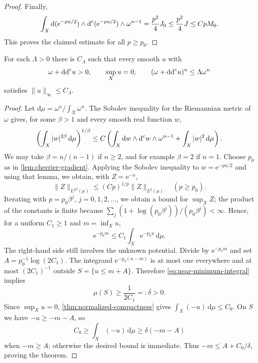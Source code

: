 \begin{proof}
Finally,
\[
 \int_X\mathrm{d}(\mathrm{e}^{-pu/2})\wedge\mathrm d^{\mathrm c}(\mathrm{e}^{-pu/2})\wedge\omega^{n-1}
 =\frac{p^2}{4}J_0\leq\frac{p^2}{4}J\leq CpM_0.
\]
This proves the claimed estimate for all $p\geq p_0$.
\end{proof}

\begin{theorem}\label{thm:smooth-czero}
For each $\Lambda>0$ there is $C_\Lambda$ such that every smooth $u$ with
\[
 \omega+\mathrm{dd}^{\mathrm{c}} u>0,\qquad \sup_Xu=0,\qquad
 (\omega+\mathrm{dd}^{\mathrm{c}} u)^n\leq\Lambda\omega^n
\]
satisfies $\|u\|_\infty\leq C_\Lambda$.
\end{theorem}
\begin{proof}
Let $\mathrm{d}\mu=\omega^n/\int_X\omega^n$. The Sobolev inequality for the Riemannian metric of $\omega$ gives, for some $\beta>1$ and every smooth real function $w$,
\[
 \left(\int_X |w|^{2\beta}\,\mathrm{d}\mu\right)^{1/\beta}
 \leq C\left(\int_X\mathrm{d}w\wedge\mathrm d^{\mathrm c} w\wedge\omega^{n-1}
                         +\int_X|w|^2\,\mathrm{d}\mu\right).
\]
We may take $\beta=n/(n-1)$ if $n\geq2$, and for example $\beta=2$ if $n=1$. Choose $p_0$ as in \cref{lem:cherrier-gradient}. Applying the Sobolev inequality to $w=\mathrm{e}^{-pu/2}$ and using that lemma, we obtain, with $Z=\mathrm{e}^{-u}$,
\[
 \|Z\|_{L^{p\beta}(\mu)}\leq(Cp)^{1/p}\|Z\|_{L^p(\mu)}
 \quad(p\geq p_0).
\]
Iterating with $p=p_0\beta^j$, $j=0,1,2,\ldots$, we obtain a bound for $\sup_XZ$; the product of the constants is finite because
$\sum_j(1+\log(p_0\beta^j))/(p_0\beta^j)<\infty$. Hence, for a uniform $C_1\geq1$ and $m=\inf_Xu$,
\begin{equation}\label{eq:near-minimum-integral}
 \mathrm{e}^{-p_0m}\leq C_1\int_X\mathrm{e}^{-p_0u}\,\mathrm{d}\mu.
\end{equation}
The right-hand side still involves the unknown potential. Divide by $\mathrm{e}^{-p_0m}$ and set $A=p_0^{-1}\log(2C_1)$. The integrand $\mathrm{e}^{-p_0(u-m)}$ is at most one everywhere and at most $(2C_1)^{-1}$ outside $S=\{u\leq m+A\}$. Therefore \eqref{eq:near-minimum-integral} implies
\[
 \mu(S)\geq\frac1{2C_1}=:\delta>0.
\]
Since $\sup_Xu=0$, \cref{thm:normalized-compactness} gives $\int_X(-u)\,\mathrm{d}\mu\leq C_0$. On $S$ we have $-u\geq-m-A$, so
\[
 C_0\geq\int_X(-u)\,\mathrm{d}\mu\geq\delta(-m-A)
\]
when $-m\geq A$; otherwise the desired bound is immediate. Thus $-m\leq A+C_0/\delta$, proving the theorem.
\end{proof}

